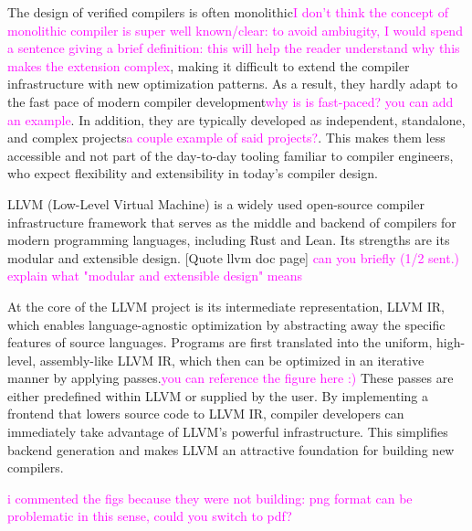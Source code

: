 The design of verified compilers is often monolithic\textcolor{magenta}{I don't think the concept of 
monolithic compiler is super well known/clear: to avoid ambiugity, I would spend a sentence giving a brief
definition: this will help the reader understand why this makes the extension complex}, 
making it difficult to extend the compiler infrastructure with new optimization patterns. 
As a result, they hardly adapt to the fast pace of modern compiler development\textcolor{magenta}{why is is fast-paced? you can add an example}. 
In addition, they are typically developed as independent, standalone, and complex projects\textcolor{magenta}{a couple example of said projects?}. 
This makes them less accessible and not part of the day-to-day tooling familiar to compiler engineers, 
who expect flexibility and extensibility in today's compiler design.

LLVM (Low-Level Virtual Machine) is a widely used open-source compiler infrastructure framework that serves as the 
middle and backend of compilers for  modern programming languages, including Rust and Lean. 
Its strengths are its modular and extensible design. [Quote llvm doc page]
\textcolor{magenta}{can you briefly (1/2 sent.) explain what "modular and extensible design" means}

At the core of the LLVM project is its intermediate representation, LLVM IR, which enables language-agnostic 
optimization by abstracting away the specific features of source languages. 
Programs are first translated into the uniform, high-level, assembly-like LLVM IR, which then can be 
optimized in an iterative manner by applying passes.\textcolor{magenta}{you can reference the figure here :)}
These passes are either predefined within LLVM or supplied by the user. 
By implementing a frontend that lowers source code to LLVM IR, compiler developers can immediately 
take advantage of LLVM's powerful infrastructure. 
This  simplifies backend generation and makes LLVM an attractive foundation for building new compilers.

%   
\textcolor{magenta}{i commented the figs because they were not building: 
png format can be problematic in this sense, could you switch to pdf?}

